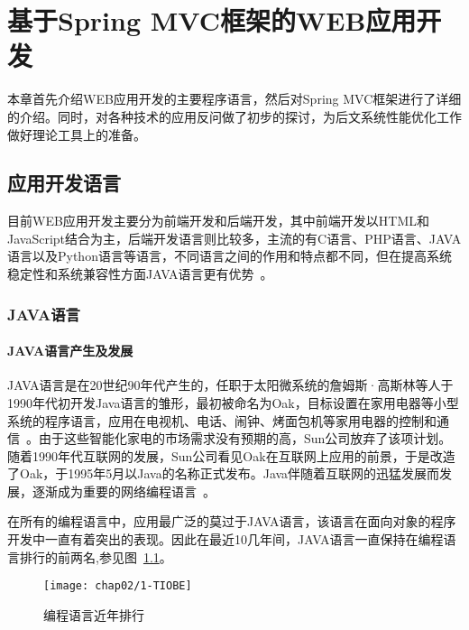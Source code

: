 \chapter{基于Spring MVC框架的WEB应用开发}
\label{cha:web}
本章首先介绍WEB应用开发的主要程序语言，然后对Spring MVC框架进行了详细的介绍。同时，对各种技术的应用反问做了初步的探讨，为后文系统性能优化工作做好理论工具上的准备。
\section{应用开发语言}
目前WEB应用开发主要分为前端开发和后端开发，其中前端开发以HTML和JavaScript结合为主，后端开发语言则比较多，主流的有C语言、PHP语言、JAVA语言以及Python语言等语言，不同语言之间的作用和特点都不同，但在提高系统稳定性和系统兼容性方面JAVA语言更有优势~\cite{suzumura2008performance}。
\subsection{JAVA语言}
\subsubsection{JAVA语言产生及发展}
JAVA语言是在20世纪90年代产生的，任职于太阳微系统的詹姆斯·高斯林等人于1990年代初开发Java语言的雏形，最初被命名为Oak，目标设置在家用电器等小型系统的程序语言，应用在电视机、电话、闹钟、烤面包机等家用电器的控制和通信~\cite{byous1998java}。由于这些智能化家电的市场需求没有预期的高，Sun公司放弃了该项计划。随着1990年代互联网的发展，Sun公司看见Oak在互联网上应用的前景，于是改造了Oak，于1995年5月以Java的名称正式发布。Java伴随着互联网的迅猛发展而发展，逐渐成为重要的网络编程语言~\cite{java维基百科}。

在所有的编程语言中，应用最广泛的莫过于JAVA语言，该语言在面向对象的程序开发中一直有着突出的表现。因此在最近10几年间，JAVA语言一直保持在编程语言排行的前两名,参见图~\ref{fig:tiobe}。
\begin{figure}[H] %
  \centering
  \texttt{[image: chap02/1-TIOBE]}
  \caption{编程语言近年排行}
  \label{fig:tiobe}
\end{figure}
